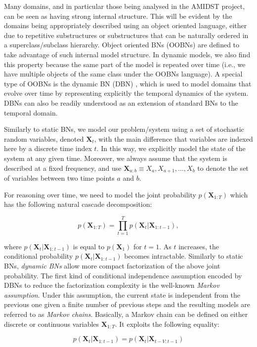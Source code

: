 Many domains, and in particular those being analysed in the AMIDST project, can be seen as having strong internal structure. This will be evident by the domains being appropriately described using an object oriented language, either due to repetitive substructures or substructures that can be naturally ordered in a superclass/subclass hierarchy.  Object oriented BNs \cite{KollerPfeffer1997} (OOBNs) are defined to take advantage of such internal model structure. In dynamic models, we also find this property because the same part of the model is repeated over time (i.e., we have multiple objects of the same class under the OOBNs language). A special type of OOBNs is the dynamic BN (DBN) \cite{DeanKanazawa1989}, which is used to model domains that evolve over time by representing explicitly the temporal dynamics of the system. DBNs can also be readily understood as an extension of standard BNs to the temporal domain. 

Similarly to static BNs, we model our problem/system using a set of stochastic random variables, denoted $\bm X_t$, with the main difference that variables are indexed here by a discrete time index $t$. In this way, we explicitly model the state of the system at any given time. Moreover, we always assume that the system is described at a fixed frequency, and use $\bm X_{a:b} \equiv X_a,X_{a+1},\ldots,X_{b}$ to denote the set of variables between two time points $a$ and $b$.  

For reasoning over time, we need to model the joint probability $p(\bm X_{1:T})$ which has the following natural cascade decomposition:

$$p(\bm X_{1:T})  = \prod_{t=1}^T p(\bm X_t|\bm X_{1:t-1}),$$

\noindent where $p(\bm X_t|\bm X_{1:t-1})$ is equal to $p(\bm X_1)$ for $t=1$. As $t$ increases, the conditional probability $p(\bm X_t|\bm X_{1:t-1})$ becomes intractable. Similarly to static BNs, \textit{dynamic BNs} allow more compact factorization of the above joint probability. The first kind of conditional independence assumption encoded by DBNs to reduce the factorization complexity is the well-known \textit{Markov assumption}. Under this assumption, the current state is independent from the previous one given a finite number of previous steps and the resulting models are referred to as \textit{Markov chains}. Basically, a Markov chain can be defined on either discrete or continuous variables $\bm X_{1:T}$. It exploits the following equality:

$$p(\bm X_t| \bm X_{1:t-1})  = p(\bm X_t|\bm X_{t-V:t-1})$$

